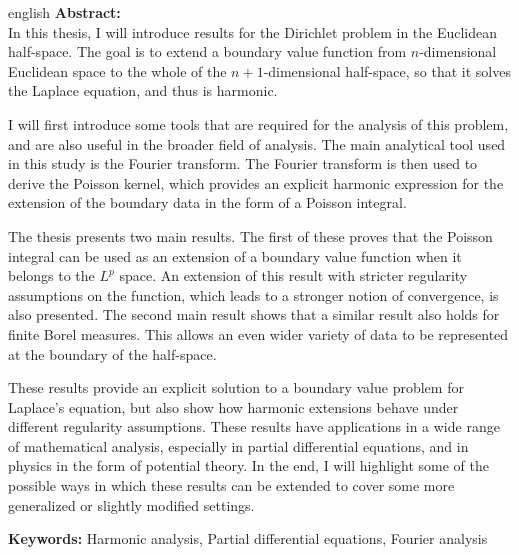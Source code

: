 \documentclass[a4paper, 11pt]{report}
\theoremstyle{plain}
\theoremstyle{definition}
\theoremstyle{remark}
\begin{document}
\begin{foreignlanguage}{english}
\noindent\textbf{Abstract:}\\ %
In this thesis, I will introduce results for the Dirichlet problem in the Euclidean half-space. The goal is to extend a boundary value function from $n$-dimensional Euclidean space to the whole of the $n+1$-dimensional half-space, so that it solves the Laplace equation, and thus is harmonic.

I will first introduce some tools that are required for the analysis of this problem, and are also useful in the broader field of analysis. The main analytical tool used in this study is the Fourier transform. The Fourier transform is then used to derive the Poisson kernel, which provides an explicit harmonic expression for the extension of the boundary data in the form of a Poisson integral.

The thesis presents two main results. The first of these proves that the Poisson integral can be used as an extension of a boundary value function when it belongs to the $L^p$ space. An extension of this result with stricter regularity assumptions on the function, which leads to a stronger notion of convergence, is also presented. The second main result shows that a similar result also holds for finite Borel measures. This allows an even wider variety of data to be represented at the boundary of the half-space.

These results provide an explicit solution to a boundary value problem for Laplace's equation, but also show how harmonic extensions behave under different regularity assumptions. These results have applications in a wide range of mathematical analysis, especially in partial differential equations, and in physics in the form of potential theory. In the end, I will highlight some of the possible ways in which these results can be extended to cover some more generalized or slightly modified settings.
\end{foreignlanguage}


\vfill

\noindent\textbf{Keywords:} Harmonic analysis, Partial differential equations, Fourier analysis %

\clearpage

%
%
\cleardoublepage
\tableofcontents


%
%
\end{document}
